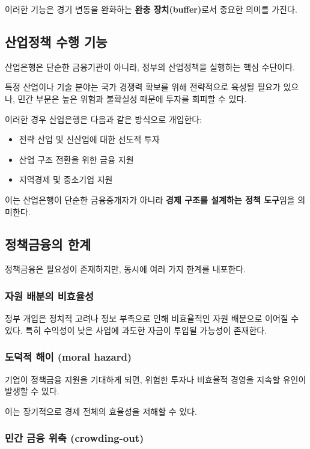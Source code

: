 이러한 기능은 경기 변동을 완화하는 \textbf{완충 장치(buffer)}로서 중요한 의미를 가진다.

\subsection{산업정책 수행 기능}

산업은행은 단순한 금융기관이 아니라, 정부의 산업정책을 실행하는 핵심 수단이다.

특정 산업이나 기술 분야는 국가 경쟁력 확보를 위해 전략적으로 육성될 필요가 있으나, 민간 부문은 높은 위험과 불확실성 때문에 투자를 회피할 수 있다.

이러한 경우 산업은행은 다음과 같은 방식으로 개입한다:

\begin{itemize}
    \item 전략 산업 및 신산업에 대한 선도적 투자
    \item 산업 구조 전환을 위한 금융 지원
    \item 지역경제 및 중소기업 지원
\end{itemize}

이는 산업은행이 단순한 금융중개자가 아니라 \textbf{경제 구조를 설계하는 정책 도구}임을 의미한다.

\subsection{정책금융의 한계}

정책금융은 필요성이 존재하지만, 동시에 여러 가지 한계를 내포한다.

\subsubsection{자원 배분의 비효율성}

정부 개입은 정치적 고려나 정보 부족으로 인해 비효율적인 자원 배분으로 이어질 수 있다.  
특히 수익성이 낮은 사업에 과도한 자금이 투입될 가능성이 존재한다.

\subsubsection{도덕적 해이 (moral hazard)}

기업이 정책금융 지원을 기대하게 되면, 위험한 투자나 비효율적 경영을 지속할 유인이 발생할 수 있다.

이는 장기적으로 경제 전체의 효율성을 저해할 수 있다.

\subsubsection{민간 금융 위축 (crowding-out)}

